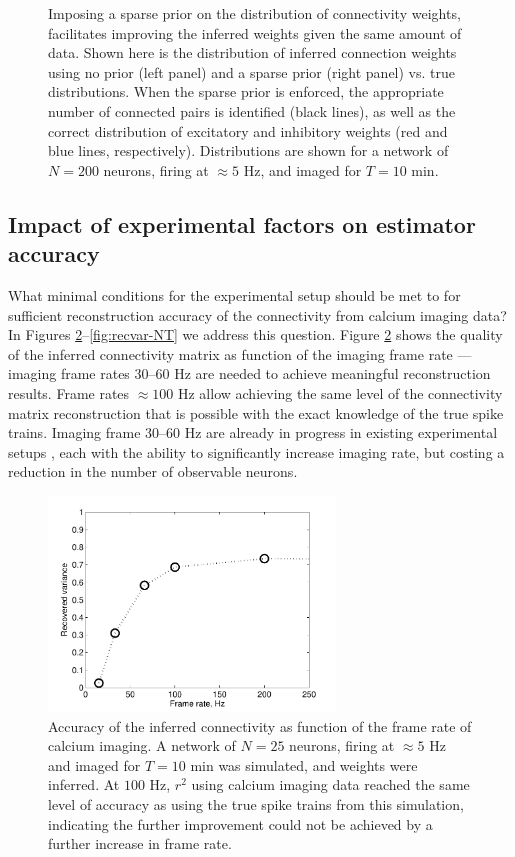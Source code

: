 \begin{figure}[h]
\begin{minipage}[c]{0.45\hsize}
\end{minipage}
\caption{Imposing a sparse prior on the distribution of connectivity weights, facilitates improving the inferred weights given the same amount of data. Shown here is the distribution of inferred connection weights using no prior (left panel) and a sparse prior (right panel) vs. true distributions. When the sparse prior is enforced, the appropriate number of connected pairs is identified (black lines), as well as the correct distribution of excitatory and inhibitory weights (red and blue lines, respectively). Distributions are shown for a network of $N=200$ neurons, firing at $\approx 5$ Hz, and imaged for $T=10$ min.}
\label{fig:distros}
\end{figure}


\subsection{Impact of experimental factors on estimator accuracy}

What minimal conditions for the experimental setup should be met to for sufficient reconstruction accuracy of the connectivity from calcium imaging data? In Figures \ref{fig:recvar}--\ref{fig:recvar-NT} we address this question. Figure \ref{fig:recvar} shows the quality of the inferred connectivity matrix as function of the imaging frame rate --- imaging frame rates $30$--$60$ Hz are needed to achieve meaningful reconstruction results. Frame rates $\approx 100$ Hz allow achieving the same level of the connectivity matrix reconstruction that is possible with the exact knowledge of the true spike trains. Imaging frame $30$--$60$ Hz are already in progress in existing experimental setups \cite{NguyenParker01,ReddySaggau05,Iyer06,SalomeBourdieu06,ReddySaggau08}, each with the ability to significantly increase imaging rate, but costing a reduction in the number of observable neurons.

\begin{figure}[h]
\centering
\includegraphics[width=3in]{../figs/FigureA5_recvar}
\caption{Accuracy of the inferred connectivity as function of the frame rate of calcium imaging.  A network of $N=25$ neurons, firing at $\approx 5$ Hz and imaged for $T=10$ min was simulated, and weights were inferred. At $100$ Hz, $r^2$ using calcium imaging data reached the same level of accuracy as using the true spike trains from this simulation, indicating the further improvement could not be achieved by a further increase in frame rate.}
\label{fig:recvar}
\end{figure}

